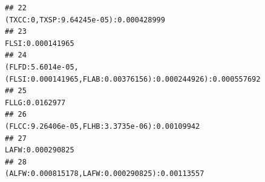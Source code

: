 \documentclass[]{article}
\begin{document}
\begin{verbatim}
## 22                                                                                                                                                                                                                                                                                                                                                                                              (TXCC:0,TXSP:9.64245e-05):0.000428999
## 23                                                                                                                                                                                                                                                                                                                                                                                                                   FLSI:0.000141965
## 24                                                                                                                                                                                                                                                                                                                                                       (FLFD:5.6014e-05,(FLSI:0.000141965,FLAB:0.00376156):0.000244926):0.000557692
## 25                                                                                                                                                                                                                                                                                                                                                                                                                     FLLG:0.0162977
## 26                                                                                                                                                                                                                                                                                                                                                                                      (FLCC:9.26406e-05,FLHB:3.3735e-06):0.00109942
## 27                                                                                                                                                                                                                                                                                                                                                                                                                   LAFW:0.000290825
## 28                                                                                                                                                                                                                                                                                                                                                                                     (ALFW:0.000815178,LAFW:0.000290825):0.00113557

\end{verbatim}
\end{document}
